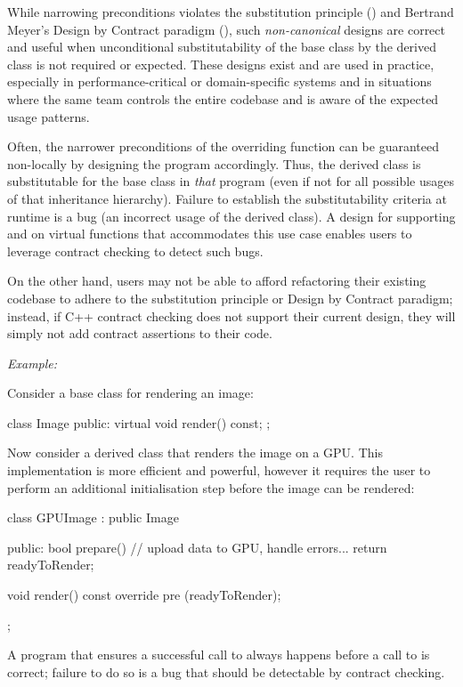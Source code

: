 While narrowing preconditions violates the substitution principle () and Bertrand Meyer's Design by Contract paradigm (), such \emph{non-canonical} designs are correct and useful when unconditional substitutability of the base class by the derived class is not required or expected. These designs exist and are used in practice, especially in performance-critical or domain-specific systems and in situations where the same team controls the entire codebase and is aware of the expected usage patterns.

Often, the narrower preconditions of the overriding function can be guaranteed non-locally by designing the program accordingly. Thus, the derived class is substitutable for the base class in \emph{that} program (even if not for all possible usages of that inheritance hierarchy). Failure to establish the substitutability criteria at runtime is a bug (an incorrect usage of the derived class). A design for supporting  and  on virtual functions that accommodates this use case enables users to leverage contract checking to detect such bugs. 

On the other hand, users may not be able to afford refactoring their existing codebase to adhere to the substitution principle or Design by Contract paradigm; instead, if C++ contract checking does not support their current design, they will simply not add contract assertions to their code.
 
 \emph{Example:}
 
Consider a base class for rendering an image:

\begin{codeblock}
class Image {
public:
  virtual void render() const;
};
\end{codeblock}

Now consider a derived class that renders the image on a GPU. This implementation is more efficient and powerful, however it requires the user to perform an additional initialisation step before the image can be rendered:

\begin{codeblock}
class GPUImage : public Image {
public:
  bool prepare() { 
    // upload data to GPU, handle errors...
    return readyToRender;
  }
  
  void render() const override
    pre (readyToRender);
};
\end{codeblock}

A program that ensures a successful call to  always happens before a call to  is correct; failure to do so is a bug that should be detectable by contract checking. 

